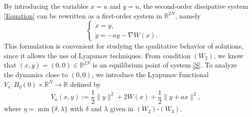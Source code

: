 \documentclass[12pt]{amsart}
\numberwithin{equation}{section}
\begin{document}
By introducing the variables $x=u$ and $y=\dot{u}$, the second-order dissipative system \eqref{Equation} can be rewritten as a first-order system in $\mathbb{R}^{2N}$, namely
\begin{equation}\label{S}
	\left\{\begin{array}{ll} 
		\dot{x} = y, & \\ 
		\dot{y} = -a y - \nabla W(x). & 
	\end{array}\right.
\end{equation}
This formulation is convenient for studying the qualitative behavior of solutions, since it allows the use of Lyapunov techniques. From condition \hyperlink{W2}{$(W_2)$}, we know that $(x,y) = (0,0) \in \mathbb{R}^{2N}$ is an equilibrium point of system \eqref{S}. To analyze the dynamics close to $(0,0)$, we introduce the Lyapunov functional $V_a : B_\eta(0)\times \mathbb{R}^N \to \mathbb{R}$ defined by
\begin{equation}\label{Va}
	V_a(x,y) := \frac{1}{2} \|y\|^2 + 2W(x) + \frac{1}{2} \|y + a x\|^2,
\end{equation}
where $\eta=\min\{\delta,\lambda\}$ with $\delta$ and $\lambda$  given in \hyperlink{W2}{$(W_2)$}-\hyperlink{W3}{$(W_3)$}.
	
\end{document}

